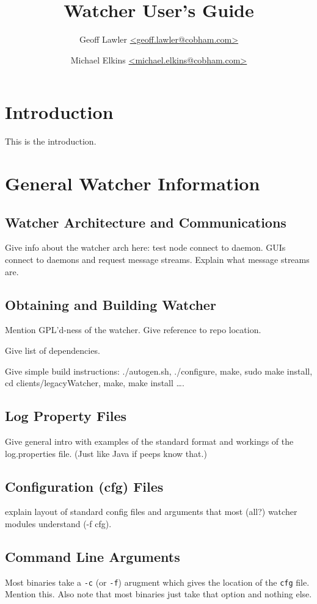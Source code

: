 \documentclass{article}
\author{Geoff Lawler \url{<geoff.lawler@cobham.com>} \and {Michael Elkins \url{<michael.elkins@cobham.com>}}}
\title{Watcher User's Guide}
\begin{document}
\maketitle
\newpage 

\tableofcontents
\newpage

\section{Introduction}

This is the introduction. 

\section{General Watcher Information}
\subsection{Watcher Architecture and Communications}
Give info about the watcher arch here: test node connect to daemon. GUIs connect to daemons and request message streams. Explain what message
streams are. 

\subsection{Obtaining and Building Watcher}
Mention GPL'd-ness of the watcher. Give reference to repo location. 

Give list of dependencies.

Give simple build instructions: ./autogen.sh, ./configure, make, sudo make install, cd clients/legacyWatcher, make, make install \ldots.

\subsection{Log Property Files}
Give general intro with examples of the standard format and workings of the log.properties file. (Just like Java if peeps know that.)

\subsection{Configuration (cfg) Files} 
explain layout of standard config files and arguments that most (all?) watcher modules understand (-f cfg). 

\subsection{Command Line Arguments}
Most binaries take a {\tt -c} (or {\tt -f}) arugment which gives the location of the {\tt cfg} file. Mention this. Also note that most binaries 
just take that option and nothing else. 
\end{document}
